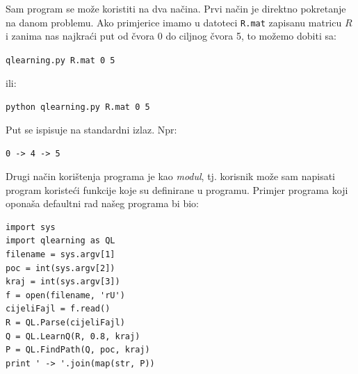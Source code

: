 \documentclass[    DIV=calc, paper=a4,fontsize=11pt, twocolumn]{scrartcl}                     %
\begin{document}
Sam program se može koristiti na dva načina. Prvi način je direktno pokretanje na danom problemu.
Ako primjerice imamo u datoteci \texttt{R.mat} zapisanu matricu $R$ i zanima nas najkraći put od čvora 0 do ciljnog čvora 5, 
to možemo dobiti sa:

\begin{center}
\texttt{qlearning.py R.mat 0 5}
\end{center}
ili:
\begin{center}
\texttt{python qlearning.py R.mat 0 5}
\end{center}
Put se ispisuje na standardni izlaz. Npr:
\begin{center}
\texttt{0 -> 4 -> 5}
\end{center}

Drugi način korištenja programa je kao \emph{modul}, tj. korisnik može sam napisati program koristeći funkcije 
koje su definirane u programu. Primjer programa koji oponaša defaultni rad našeg programa bi bio:


\begin{lstlisting}
import sys
import qlearning as QL
filename = sys.argv[1]
poc = int(sys.argv[2])
kraj = int(sys.argv[3]) 
f = open(filename, 'rU')
cijeliFajl = f.read()
R = QL.Parse(cijeliFajl)
Q = QL.LearnQ(R, 0.8, kraj)
P = QL.FindPath(Q, poc, kraj)    
print ' -> '.join(map(str, P))
\end{lstlisting}
\end{document}
